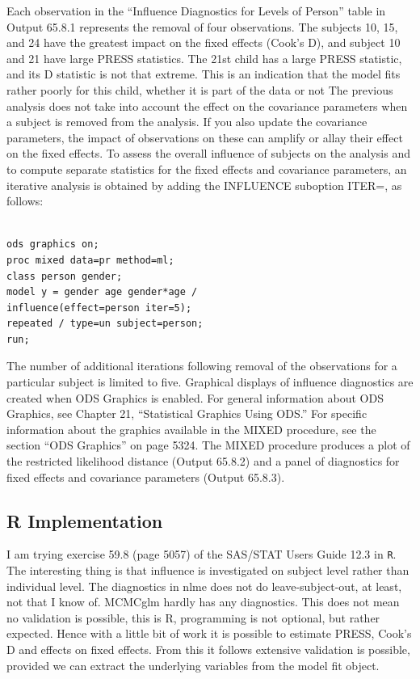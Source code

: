 \documentclass[a4paper,12pt]{article}
\begin{document}
Each observation in the “Influence Diagnostics for Levels of Person” table in Output 65.8.1 represents the
removal of four observations. The subjects 10, 15, and 24 have the greatest impact on the fixed effects
(Cook’s D), and subject 10 and 21 have large PRESS statistics. The 21st child has a large PRESS statistic,
and its D statistic is not that extreme. This is an indication that the model fits rather poorly for this child,
whether it is part of the data or not
The previous analysis does not take into account the effect on the covariance parameters when a subject is
removed from the analysis. If you also update the covariance parameters, the impact of observations on these
can amplify or allay their effect on the fixed effects. To assess the overall influence of subjects on the analysis
and to compute separate statistics for the fixed effects and covariance parameters, an iterative analysis is
obtained by adding the INFLUENCE suboption ITER=, as follows:
\begin{verbatim}

ods graphics on;
proc mixed data=pr method=ml;
class person gender;
model y = gender age gender*age /
influence(effect=person iter=5);
repeated / type=un subject=person;
run;
\end{verbatim}
The number of additional iterations following removal of the observations for a particular subject is limited
to five. Graphical displays of influence diagnostics are created when ODS Graphics is enabled. For
general information about ODS Graphics, see Chapter 21, “Statistical Graphics Using ODS.” For specific
information about the graphics available in the MIXED procedure, see the section “ODS Graphics” on
page 5324.
The MIXED procedure produces a plot of the restricted likelihood distance (Output 65.8.2) and a panel of
diagnostics for fixed effects and covariance parameters (Output 65.8.3).
\newpage

\subsection{R Implementation}
 I am trying exercise 59.8 (page 5057) of the SAS/STAT Users Guide 12.3 in \texttt{R}. The interesting thing is that influence is investigated on subject level rather than individual level. The diagnostics in nlme does not do leave-subject-out, at least, not that I know of. MCMCglm hardly has any diagnostics. This does not mean no validation is possible, this is R, programming is not optional, but rather expected. Hence with a little bit of work it is possible to estimate PRESS, Cook's D and effects on fixed effects. From this it follows extensive validation is possible, provided we can extract the underlying variables from the model fit object.
\newpage
\end{document}
